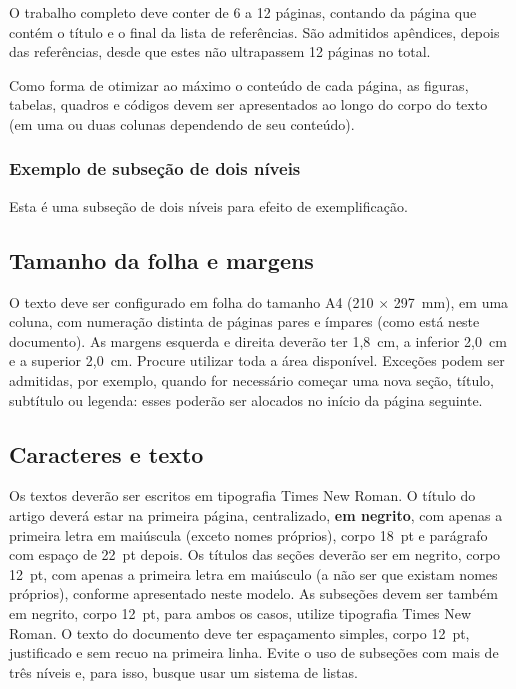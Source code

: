 \documentclass[12pt, a4paper, twoside, onecolumn]{article}
\begin{document}
O trabalho completo deve conter de 6 a 12 páginas, contando da  página que contém o título e o final da lista de referências. São admitidos apêndices, depois das referências, desde que estes não ultrapassem 12 páginas no total. 

Como forma de otimizar ao máximo o conteúdo de cada página, as figuras, tabelas, quadros e códigos devem ser apresentados ao longo do corpo do texto (em uma ou duas colunas dependendo de seu conteúdo).

\subsubsection{Exemplo de subseção de dois níveis}

Esta é uma subseção de dois níveis para efeito de exemplificação.

\subsection{Tamanho da folha e margens}

O texto deve ser configurado em folha do tamanho A4 (210 $\times$ 297~mm), em uma coluna, com numeração distinta de páginas pares e ímpares (como está neste documento). As margens esquerda e direita deverão ter 1,8~cm, a inferior 2,0~cm e a superior 2,0~cm. Procure utilizar toda a área disponível. Exceções podem ser admitidas, por exemplo, quando for necessário começar uma nova seção, título, subtítulo ou legenda: esses poderão ser alocados no início da página seguinte.

\subsection{Caracteres e texto}

Os textos deverão ser escritos em tipografia Times New Roman. O título do artigo deverá estar na primeira página, centralizado, \textbf{em negrito}, com apenas a primeira letra em maiúscula (exceto nomes próprios), corpo 18~pt e parágrafo com espaço de 22~pt depois. Os títulos das seções deverão ser em negrito, corpo 12~pt, com apenas a primeira letra em maiúsculo (a não ser que existam nomes próprios), conforme apresentado neste modelo. As subseções devem ser também em negrito, corpo 12~pt, para ambos os casos, utilize tipografia Times New Roman. O texto do documento deve ter espaçamento simples, corpo 12~pt, justificado e sem recuo na primeira linha. Evite o uso de subseções com mais de três níveis e, para isso, busque usar um sistema de listas. 
\end{document}
